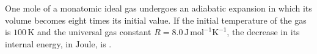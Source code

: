 
    \item One mole of a monatomic ideal gas undergoes an adiabatic expansion in which its volume becomes eight times its initial value. If the initial temperature of the gas is \(100 \, \text{K}\) and the universal gas constant \(R = 8.0 \, \text{J} \, \text{mol}^{-1}\text{K}^{-1}\), the decrease in its internal energy, in \(\text{Joule}\), is \underline{\hspace{3cm}}.
